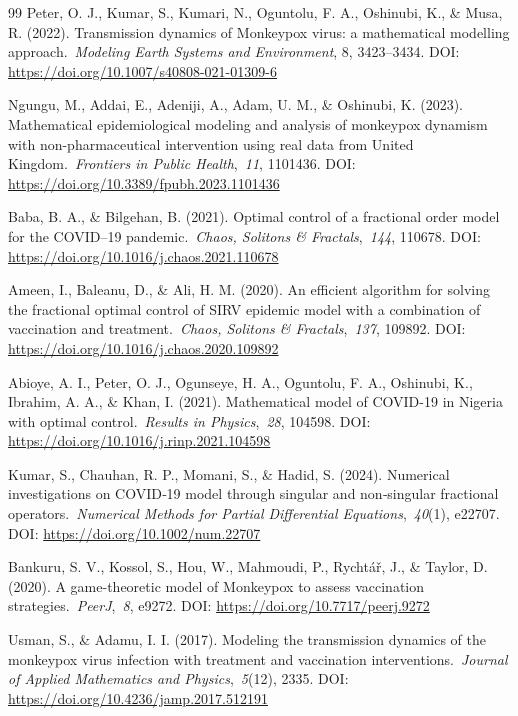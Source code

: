 \documentclass[10pt]{NSP1}
\begin{document}
\begin{thebibliography}{99}
Peter, O. J., Kumar, S., Kumari, N., Oguntolu, F. A., Oshinubi, K., \& Musa, R. (2022). Transmission dynamics of Monkeypox virus: a mathematical modelling approach.~\emph{Modeling Earth Systems and Environment}, 8, 3423--3434. DOI: \url{https://doi.org/10.1007/s40808-021-01309-6}

Ngungu, M., Addai, E., Adeniji, A., Adam, U. M., \& Oshinubi, K. (2023). Mathematical epidemiological modeling and analysis of monkeypox dynamism with non-pharmaceutical intervention using real data from United Kingdom.~\emph{Frontiers in Public Health},~\emph{11}, 1101436. DOI: \url{https://doi.org/10.3389/fpubh.2023.1101436}

Baba, B. A., \& Bilgehan, B. (2021). Optimal control of a fractional order model for the COVID--19 pandemic.~\emph{Chaos, Solitons \& Fractals},~\emph{144}, 110678. DOI: \url{https://doi.org/10.1016/j.chaos.2021.110678}

Ameen, I., Baleanu, D., \& Ali, H. M. (2020). An efficient algorithm for solving the fractional optimal control of SIRV epidemic model with a combination of vaccination and treatment.~\emph{Chaos, Solitons \& Fractals},~\emph{137}, 109892. DOI: \url{https://doi.org/10.1016/j.chaos.2020.109892}

Abioye, A. I., Peter, O. J., Ogunseye, H. A., Oguntolu, F. A., Oshinubi, K., Ibrahim, A. A., \& Khan, I. (2021). Mathematical model of COVID-19 in Nigeria with optimal control.~\emph{Results in Physics},~\emph{28}, 104598. DOI: \url{https://doi.org/10.1016/j.rinp.2021.104598}

Kumar, S., Chauhan, R. P., Momani, S., \& Hadid, S. (2024). Numerical investigations on COVID‐19 model through singular and non‐singular fractional operators.~\emph{Numerical Methods for Partial Differential Equations},~\emph{40}(1), e22707. DOI: \url{https://doi.org/10.1002/num.22707}

Bankuru, S. V., Kossol, S., Hou, W., Mahmoudi, P., Rychtář, J., \& Taylor, D. (2020). A game-theoretic model of Monkeypox to assess vaccination strategies.~\emph{PeerJ},~\emph{8}, e9272. DOI: \url{https://doi.org/10.7717/peerj.9272}

Usman, S., \& Adamu, I. I. (2017). Modeling the transmission dynamics of the monkeypox virus infection with treatment and vaccination interventions.~\emph{Journal of Applied Mathematics and Physics},~\emph{5}(12), 2335. DOI: \url{https://doi.org/10.4236/jamp.2017.512191}


\end{thebibliography}
\end{document}
